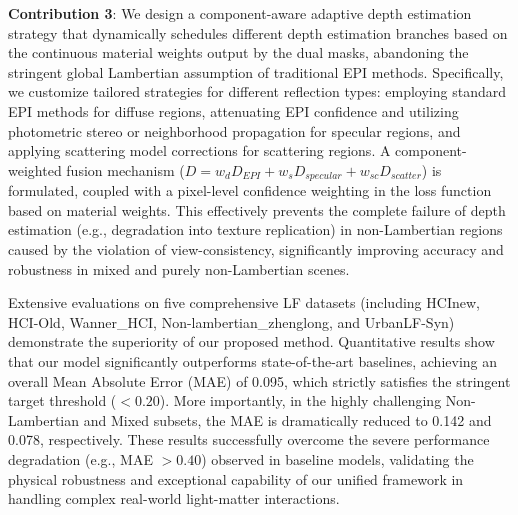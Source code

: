 \item \textbf{Contribution 3}: We design a component-aware adaptive depth estimation strategy that dynamically schedules different depth estimation branches based on the continuous material weights output by the dual masks, abandoning the stringent global Lambertian assumption of traditional EPI methods. Specifically, we customize tailored strategies for different reflection types: employing standard EPI methods for diffuse regions, attenuating EPI confidence and utilizing photometric stereo or neighborhood propagation for specular regions, and applying scattering model corrections for scattering regions. A component-weighted fusion mechanism (\(D = w_d D_{EPI} + w_s D_{specular} + w_{sc} D_{scatter}\)) is formulated, coupled with a pixel-level confidence weighting in the loss function based on material weights. This effectively prevents the complete failure of depth estimation (e.g., degradation into texture replication) in non-Lambertian regions caused by the violation of view-consistency, significantly improving accuracy and robustness in mixed and purely non-Lambertian scenes.

Extensive evaluations on five comprehensive LF datasets (including HCInew, HCI-Old, Wanner\_HCI, Non-lambertian\_zhenglong, and UrbanLF-Syn) demonstrate the superiority of our proposed method. Quantitative results show that our model significantly outperforms state-of-the-art baselines, achieving an overall Mean Absolute Error (MAE) of 0.095, which strictly satisfies the stringent target threshold (\(<0.20\)). More importantly, in the highly challenging Non-Lambertian and Mixed subsets, the MAE is dramatically reduced to 0.142 and 0.078, respectively. These results successfully overcome the severe performance degradation (e.g., MAE \(>0.40\)) observed in baseline models, validating the physical robustness and exceptional capability of our unified framework in handling complex real-world light-matter interactions.